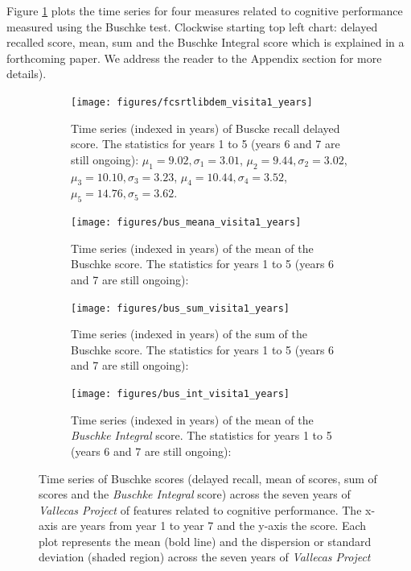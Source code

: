 \documentclass[11pt]{article}
\theoremstyle{definition}
\theoremstyle{remark}
\begin{document}
Figure \ref{fig:busper4} plots the time series for four measures related to cognitive performance measured using the Buschke test. Clockwise starting top left chart: delayed recalled score, mean, sum and the Buschke Integral score which is explained in a forthcoming paper. We address the reader to the Appendix section for more details).

\begin{figure}[H]
    \centering
    \begin{subfigure}[t]{0.45\textwidth}
        \centering
        \texttt{[image: figures/fcsrtlibdem\_visita1\_years]}
        \caption{Time series (indexed in years) of Buscke recall delayed score. The statistics for years 1 to 5 (years 6 and 7 are still ongoing): $\mu_{1}=9.02, \sigma_{1}=3.01$, $\mu_{2}=9.44, \sigma_{2}=3.02$, $\mu_{3}=10.10, \sigma_{3}=3.23$, $\mu_{4}=10.44, \sigma_{4}=3.52$,$\mu_{5}=14.76,\sigma_{5}=3.62$.}
    \end{subfigure}
    \hfill
    \begin{subfigure}[t]{0.45\textwidth}
        \centering
        \texttt{[image: figures/bus\_meana\_visita1\_years]}
        \caption{Time series (indexed in years) of the mean of the Buschke score. The statistics for years 1 to 5 (years 6 and 7 are still ongoing): }
    \end{subfigure}%
    
     \begin{subfigure}[t]{0.45\textwidth}
        \centering
        \texttt{[image: figures/bus\_sum\_visita1\_years]}
        \caption{Time series (indexed in years) of the sum of the Buschke score. The statistics for years 1 to 5 (years 6 and 7 are still ongoing):}
    \end{subfigure}
    \hfill 
    \begin{subfigure}[t]{0.45\textwidth}
        \centering
        \texttt{[image: figures/bus\_int\_visita1\_years]}
        \caption{Time series (indexed in years) of the mean of the \emph{Buschke Integral} score. The statistics for years 1 to 5 (years 6 and 7 are still ongoing):}
    \end{subfigure}%
   
    \caption{Time series of Buschke scores (delayed recall, mean of scores, sum of scores and the \emph{Buschke Integral} score) across the seven years of \emph{Vallecas Project} of features related to cognitive performance. The x-axis are years from year 1 to year 7 and the y-axis the score. Each plot represents the mean (bold line) and the dispersion or standard deviation (shaded region) across the seven years of \emph{Vallecas Project}} 
    \label{fig:busper4}
\end{figure}
\end{document}
